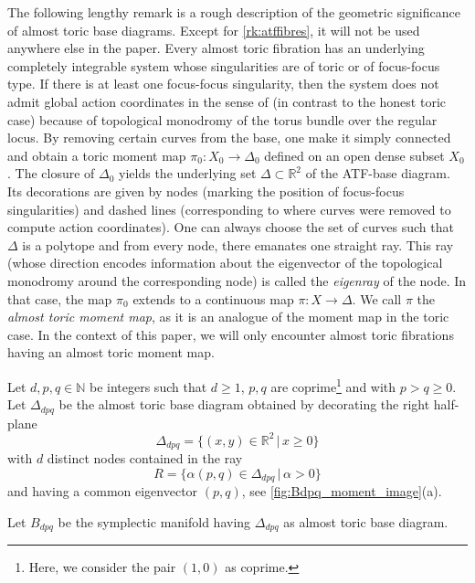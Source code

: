 \documentclass[12pt,a4paper,draft]{scrartcl}
\begin{document}
\begin{remark}
    \label{rk:atfbasediagram}
    The following lengthy remark is a rough description of the geometric significance of almost toric base diagrams.
    Except for \cref{rk:atffibres}, it will not be used anywhere else in the paper.
    Every almost toric fibration has an underlying completely integrable system whose singularities are of toric or of focus-focus type.
    If there is at least one focus-focus singularity, then the system does not admit global action coordinates in the sense of \cite{Dui80} (in contrast to the honest toric case) because of topological monodromy of the torus bundle over the regular locus.
    By removing certain curves from the base, one make it simply connected and obtain a toric moment map $\pi_0 \colon X_0 \rightarrow \Delta_0$ defined on an open dense subset $X_0$.
    The closure of $\Delta_0$ yields the underlying set $\Delta \subset \mathbb{R}^2$ of the ATF-base diagram.
    Its decorations are given by nodes (marking the position of focus-focus singularities) and dashed lines (corresponding to where curves were removed to compute action coordinates).
    One can always choose the set of curves such that $\Delta$ is a polytope and from every node, there emanates one straight ray.
    This ray (whose direction encodes information about the eigenvector of the topological monodromy around the corresponding node) is called the \emph{eigenray} of the node.
    In that case, the map $\pi_0$ extends to a continuous map $\pi \colon X \rightarrow \Delta$.
    We call $\pi$ the \emph{almost toric moment map}, as it is an analogue of the moment map in the toric case.
    In the context of this paper, we will only encounter almost toric fibrations having an almost toric moment map. 
\end{remark}

Let $d,p,q \in \mathbb{N}$ be integers such that $d≥1$,   $p,q$ are coprime\footnote{Here, we consider the pair $(1,0)$ as coprime.} and with $p>q≥0$. Let $\Delta_{dpq}$ be the almost toric base diagram obtained by decorating the right half-plane
$$\Delta_{dpq} = \{ (x,y) \in \mathbb{R}^2 \, \vert \, x \geqslant 0 \}$$
with $d$ distinct nodes contained in the ray 
\begin{equation}
  \label{eqn:eigenline}
  R = \{\alpha (p,q) \in \Delta_{dpq} \, \vert \, \alpha > 0 \}
\end{equation}
and having a common eigenvector $(p,q)$, see \cref{fig:Bdpq_moment_image}(a). 

\begin{definition}
    \label{def:bdpq}
    Let $B_{dpq}$ be the symplectic manifold having $\Delta_{dpq}$ as almost toric base diagram. 
\end{definition}
\end{document}
